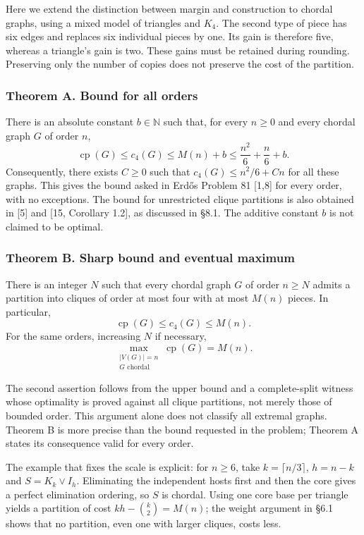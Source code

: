 \documentclass[english,11pt,a4paper]{article}
\begin{document}
Here we extend the distinction between margin and construction to chordal graphs, using a mixed model of triangles and \(K_4\). The second type of piece has six edges and replaces six individual pieces by one. Its gain is therefore five, whereas a triangle's gain is two. These gains must be retained during rounding. Preserving only the number of copies does not preserve the cost of the partition.

\subsubsection{Theorem A. Bound for all orders}\label{theorem-a.-bound-for-all-orders}

There is an absolute constant \(b\in\mathbb N\) such that, for every \(n\ge0\) and every chordal graph \(G\) of order \(n\), \[
\operatorname{cp}(G)\le c_4(G)\le M(n)+b
\le\frac{n^2}{6}+\frac n6+b.
\tag{A}
\] Consequently, there exists \(C\ge0\) such that \(c_4(G)\le n^2/6+Cn\) for all these graphs. This gives the bound asked in Erdős Problem 81 {[}1,8{]} for every order, with no exceptions. The bound for unrestricted clique partitions is also obtained in {[}5{]} and {[}15, Corollary 1.2{]}, as discussed in §8.1. The additive constant \(b\) is not claimed to be optimal.

\subsubsection{Theorem B. Sharp bound and eventual maximum}\label{theorem-b.-sharp-bound-and-eventual-maximum}

There is an integer \(N\) such that every chordal graph \(G\) of order \(n\ge N\) admits a partition into cliques of order at most four with at most \(M(n)\) pieces. In particular, \[
\operatorname{cp}(G)\le c_4(G)\le M(n).
\tag{1.1}
\] For the same orders, increasing \(N\) if necessary, \[
\max_{\substack{|V(G)|=n\\G\text{ chordal}}}\operatorname{cp}(G)=M(n).
\tag{1.2}
\]

The second assertion follows from the upper bound and a complete-split witness whose optimality is proved against all clique partitions, not merely those of bounded order. This argument alone does not classify all extremal graphs. Theorem B is more precise than the bound requested in the problem; Theorem A states its consequence valid for every order.

The example that fixes the scale is explicit: for \(n\ge6\), take \(k=\lceil n/3\rceil\), \(h=n-k\) and \(S=K_k\vee I_h\). Eliminating the independent hosts first and then the core gives a perfect elimination ordering, so \(S\) is chordal. Using one core base per triangle yields a partition of cost \(kh-\binom k2=M(n)\); the weight argument in §6.1 shows that no partition, even one with larger cliques, costs less.
\end{document}
